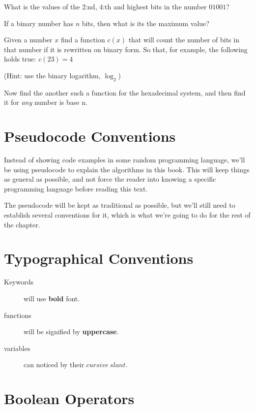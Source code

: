 \begin{Exercise}[label={bits-value-order}]
  What is the values of the 2:nd, 4:th and highest bits in the
  number $01001$?
\end{Exercise}

\begin{Exercise}[label={n-bits-max-val}]
  If a binary number has $n$ bits, then what is its the maximum value?
\end{Exercise}

\begin{Exercise}[label={count-bits-func}]
  Given a number $x$ find a function $c(x)$ that will count the number
  of bits in that number if it is rewritten on binary form. So that,
  for example, the following holds true: $c(23) = 4$

  (Hint: use the binary logarithm, $\log_2$)

  Now find the another such a function for the hexadecimal system, and
  then find it for \textit{any} number is base n.
\end{Exercise}

\section{Pseudocode Conventions}

Instead of showing code examples in some random programming language,
we'll be using pseudocode to explain the algorithms in this book. This
will keep things as general as possible, and not force the reader into
knowing a specific programming language before reading this text.

The pseudocode will be kept as traditional as possible, but we'll
still need to establish several conventions for it, which is what
we're going to do for the rest of the chapter.

\section{Typographical Conventions}

\begin{description}
\item[Keywords] will use \textbf{bold} font.
\item[functions] will be signified by \textbf{uppercase}.
\item[variables] can noticed by their $cursive\ slant$.
\end{description}

\section{Boolean Operators}
\label{sec:boolean-operators}

